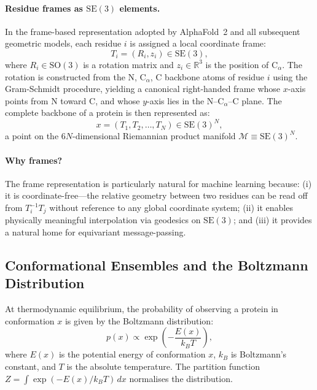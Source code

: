 \documentclass[12pt,a4paper]{article}
\newcommand{\SE}{\mathrm{SE}(3)}
\newcommand{\SOthree}{\mathrm{SO}(3)}
\newcommand{\Rthree}{\mathbb{R}^3}
\begin{document}
\paragraph{Residue frames as $\SE$ elements.}
In the frame-based representation adopted by AlphaFold~2 \citep{jumper2021} and
all subsequent geometric models, each residue $i$ is assigned a local coordinate frame:
\begin{equation}
  T_i = (R_i, z_i) \in \SE,
\end{equation}
where $R_i \in \SOthree$ is a rotation matrix and $z_i \in \Rthree$ is the position of
C$_\alpha$.  The rotation is constructed from the N, C$_\alpha$, C backbone atoms of
residue $i$ using the Gram-Schmidt procedure, yielding a canonical right-handed frame
whose $x$-axis points from N toward C, and whose $y$-axis lies in the N--C$_\alpha$--C
plane.  The complete backbone of a protein is then represented as:
\begin{equation}
  \label{eq:backbone}
  x = (T_1, T_2, \ldots, T_N) \in \SE^N,
\end{equation}
a point on the $6N$-dimensional Riemannian product manifold $\mathcal{M} \equiv \SE^N$.

\paragraph{Why frames?}
The frame representation is particularly natural for machine learning because:
(i) it is coordinate-free---the relative geometry between two residues can be read off
from $T_i^{-1} T_j$ without reference to any global coordinate system;
(ii) it enables physically meaningful interpolation via geodesics on $\SE$; and
(iii) it provides a natural home for equivariant message-passing.

\subsection{Conformational Ensembles and the Boltzmann Distribution}
\label{sec:boltzmann}

At thermodynamic equilibrium, the probability of observing a protein in conformation $x$ is
given by the Boltzmann distribution:
\begin{equation}
  \label{eq:boltzmann}
  p(x) \propto \exp\!\left(-\frac{E(x)}{k_B T}\right),
\end{equation}
where $E(x)$ is the potential energy of conformation $x$, $k_B$ is Boltzmann's constant, and
$T$ is the absolute temperature.  The partition function $Z = \int \exp(-E(x)/k_BT)\,dx$
normalises the distribution.
\end{document}
